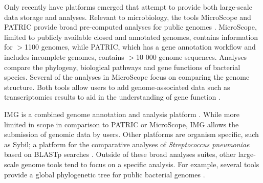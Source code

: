\documentclass[a4paper,twoside]{article}
\begin{document}
Only recently have platforms emerged that attempt to provide both large-scale data storage and analyses. Relevant to microbiology, the tools MicroScope and PATRIC provide broad pre-computed analyses for public genomes \cite{vallenet_microscope--integrated_2012,wattam2013}.  MicroScope, limited to publicly available closed and annotated genomes, contains information for $>$1100 genomes, while PATRIC, which has a gene annotation workflow and includes incomplete genomes, contains $>$10 000 genome sequences. Analyses compare the phylogeny, biological pathways and gene functions of bacterial species. Several of the analyses in MicroScope focus on comparing the genome structure. Both tools allow users to add genome-associated data such as transcriptomics results to aid in the understanding of gene function \cite{vallenet_microscope--integrated_2012,wattam2013}. 

IMG is a combined genome annotation and analysis platform \cite{marko2013}. While more limited in scope in comparison to PATRIC or MicroScope, IMG allows the submission of genomic data by users. Other platforms are organism specific, such as Sybil; a platform for the comparative analyses of \textit{Streptococcus pneumoniae} based on BLASTp searches \cite{riley_using_2012}. Outside of these broad analyses suites, other large-scale genome tools tend to focus on a specific analysis. For example, several tools provide a global phylogenetic tree for public bacterial genomes \cite{letunic2011,fang2013,federhen2012}.
\end{document}
